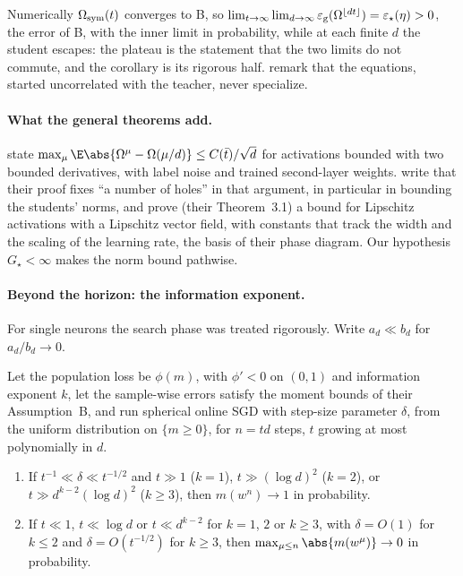 \begin{refsection}
Numerically $\Omega_{\mathrm{sym}}(t)$ converges to B, so $\lim_{t\to\infty}\lim_{d\to\infty}\varepsilon_{\mathrm g}(\Omega^{\lfloor dt\rfloor})=\varepsilon_\star(\eta)>0$, the error of B, with the inner limit in probability, while at each finite $d$ the student escapes: the plateau is the statement that the two limits do not commute, and the corollary is its rigorous half. \Textcite{VeigaEtAl2022} remark that the equations, started uncorrelated with the teacher, never specialize.

\paragraph{What the general theorems add.} \Textcite[Theorem~1.1]{GoldtEtAl2020a} state $\max_\mu\E\abs{\Omega^\mu-\Omega(\mu/d)}\le C(\bar t)/\sqrt d$ for activations bounded with two bounded derivatives, with label noise and trained second-layer weights. \Textcite{VeigaEtAl2022} write that their proof fixes ``a number of holes'' in that argument, in particular in bounding the students' norms, and prove (their Theorem~3.1) a bound for Lipschitz activations with a Lipschitz vector field, with constants that track the width and the scaling of the learning rate, the basis of their phase diagram. Our hypothesis $G_\star<\infty$ makes the norm bound pathwise.

\paragraph{Beyond the horizon: the information exponent.} For single neurons the search phase was treated rigorously. Write $a_d\ll b_d$ for $a_d/b_d\to0$.

\begin{theorem}\label{thm:sgd:bgj}
Let the population loss be $\phi(m)$, with $\phi'<0$ on $(0,1)$ and information exponent $k$, let the sample-wise errors satisfy the moment bounds of their Assumption~B, and run spherical online SGD with step-size parameter $\delta$, from the uniform distribution on $\{m\ge0\}$, for $n=td$ steps, $t$ growing at most polynomially in $d$.
\begin{enumerate}
\item If $t^{-1}\ll\delta\ll t^{-1/2}$ and $t\gg1$ ($k=1$), $t\gg(\log d)^2$ ($k=2$), or $t\gg d^{k-2}(\log d)^2$ ($k\ge3$), then $m(w^n)\to1$ in probability.
\item If $t\ll1$, $t\ll\log d$ or $t\ll d^{k-2}$ for $k=1$, $2$ or $k\ge3$, with $\delta=O(1)$ for $k\le2$ and $\delta=O(t^{-1/2})$ for $k\ge3$, then $\max_{\mu\le n}\abs{m(w^\mu)}\to0$ in probability.
\end{enumerate}
\end{theorem}


\end{refsection}
